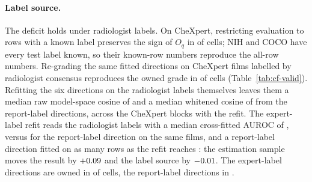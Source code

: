 \documentclass{article}
\begin{document}
\paragraph{Label source.} The deficit holds under radiologist labels. On CheXpert, restricting evaluation to rows with a known label preserves the sign of $O_q$ in \cfValKnownSignAgree{} of \cfValKnownN{} cells; NIH and COCO have every test label known, so their known-row numbers reproduce the all-row numbers. Re-grading the same fitted directions on \cfValidRows{} CheXpert films labelled by radiologist consensus \citep{irvin2019chexpert} reproduces the owned grade in \cfValidOwnedAgree{} of \cfValidCells{} cells (Table~\ref{tab:cf-valid}). Refitting the six directions on the radiologist labels themselves leaves them a median raw model-space cosine of \cfValidfitCosRaw{} and a median whitened cosine of \cfValidfitCosWhitened{} from the report-label directions, across the \cfValidfitBlocks{} CheXpert blocks with the refit. The expert-label refit reads the radiologist labels with a median cross-fitted AUROC of \cfValidfitAurocExpert{}, versus \cfValidfitAurocReportDir{} for the report-label direction on the same films, and a report-label direction fitted on as many rows as the refit reaches \cfVfArmReportSubAuroc{}: the estimation sample moves the result by $+0.09$ and the label source by $-0.01$. The expert-label directions are owned in \cfValidfitOwnedExpert{} of \cfValidfitCells{} cells, the report-label directions in \cfValidfitOwnedReport{}.
\end{document}
